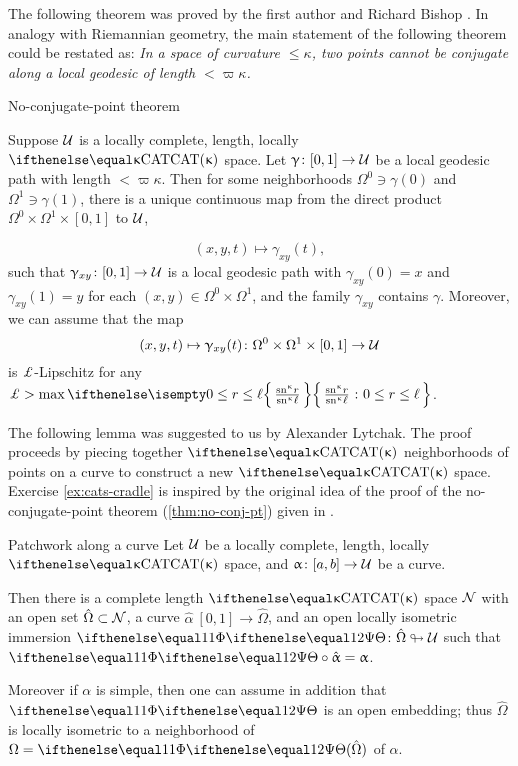 The following theorem was proved by the first author and Richard Bishop \cite{alexander-bishop:h-c}.
In analogy with Riemannian geometry, the main statement of the following theorem could be restated as: 
\emph{In a space of curvature $\le\kappa$, two points cannot be conjugate along a local geodesic of length $<\varpi\kappa$.}


\begin{thm}{No-conjugate-point theorem}
\label{thm:no-conj-pt}{\sloppy 
Suppose $\mathcal{U}$ is a locally complete, length, locally $\CAT\kappa$ space.
Let $\gamma\:[0,1]\to\spc{U}$ be a local geodesic path with length $<\varpi\kappa$.
Then for some neighborhoods $\Omega^0\ni \gamma(0)$ and $\Omega^1\ni\gamma(1)$, 
there is a unique continuous map from the direct product $\Omega^0\times \Omega^1\times[0,1]$ to $\mathcal{U}$, 

\[(x,y,t)\mapsto\gamma_{x y}(t),\]  
such that 
$\gamma_{x y}\:[0,1]\to\spc{U}$ is a local geodesic path with 
$\gamma_{x y}(0)=x$ and 
$\gamma_{x y}(1)=y$ for each $(x,y)\in\Omega^0\times\Omega^1$,
and the family $\gamma_{x y}$ contains $\gamma$.
Moreover, we can assume that the map 
\[(x,y,t)\mapsto\gamma_{x y}(t)\:\Omega^0\times\Omega^1\times[0,1]\to\spc{U}\] 
is $\Lip$-Lipschitz
for any
$\Lip>\max\set{\tfrac{\sn\kappa r}{\sn\kappa \ell}}{0\le r\le \ell}$.

}
\end{thm}

The following lemma was suggested to us by Alexander Lytchak.
The proof proceeds by piecing together $\CAT{\kappa}$  neighborhoods of points on a curve to construct a new $\CAT{\kappa}$ space.  
Exercise \ref{ex:cats-cradle} is inspired by the original idea of the proof of the no-conjugate-point theorem (\ref{thm:no-conj-pt}) given in \cite{alexander-bishop:h-c}.

\begin{thm}{Patchwork along a curve}
\label{lem:patch}
Let $\mathcal{U}$ be a locally complete, length, locally $\CAT\kappa$ space, 
and $\alpha\:[a,b]\to\spc{U}$ be a curve.

Then there is a complete length $\CAT\kappa$ space $\mathcal{N}$
with an open set $\hat\Omega\subset \spc{N}$,
a curve $\hat\alpha\:[0,1]\to\hat\Omega$,
and an open locally isometric immersion 
 $\map\:\hat\Omega\looparrowright\spc{U}$ such that
$\map\circ\hat\alpha=\alpha$.

Moreover if $\alpha$ is simple, then one can assume in addition that $\map$ is an open embedding;
thus $\hat\Omega$ is locally isometric to a neighborhood of $\Omega=\map(\hat\Omega)$ of $\alpha$.
\end{thm}



